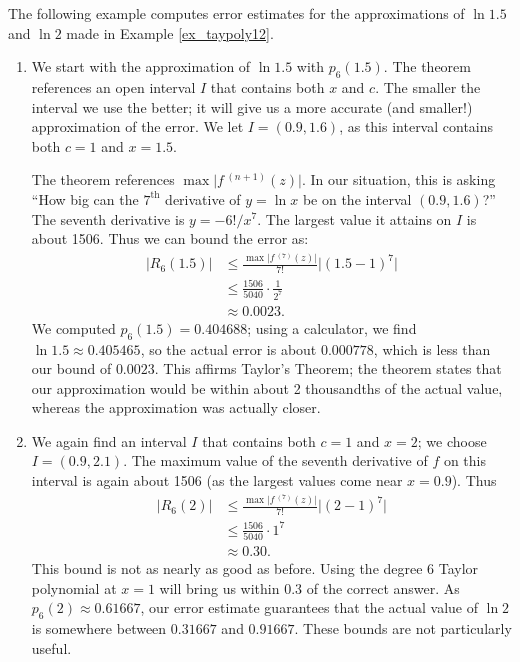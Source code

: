 The following example computes error estimates for the approximations of $\ln 1.5$ and $\ln 2$ made in Example \ref{ex_taypoly12}.\\

{\begin{enumerate}
\item	We start with the approximation of $\ln 1.5$ with $p_6(1.5)$. The theorem references an open interval $I$ that contains both $x$ and $c$. The smaller the interval we use the better; it will give us a more accurate (and smaller!) approximation of the error. We let $I = (0.9,1.6)$, as this interval contains both $c=1$ and $x=1.5$. 

The theorem references $\max\big|f\,^{(n+1)}(z)\big|$. In our situation, this is asking ``How big can the $7^\text{th}$ derivative of $y=\ln x$ be on the interval $(0.9,1.6)$?'' The seventh derivative is $y = -6!/x^7$. The largest value it attains on $I$ is about 1506. Thus we can bound the error as:
\begin{align*}
\big|R_6(1.5)\big| &\leq \frac{\max\big|f\,^{(7)}(z)\big|}{7!}\big|(1.5-1)^7\big|\\
					&\leq \frac{1506}{5040}\cdot\frac1{2^7}\\
					&\approx 0.0023.
\end{align*}
\noindent%
We computed $p_6(1.5) = 0.404688$; using a calculator, we find $\ln 1.5 \approx 0.405465$, so the actual error is about $0.000778$, which is less than our bound of $0.0023$. This affirms Taylor's Theorem; the theorem states that our approximation would be within about 2 thousandths of the actual value, whereas the approximation was actually closer.

\item		We again find an interval $I$ that contains both $c=1$ and $x=2$; we choose $I = (0.9,2.1)$. The maximum value of the seventh derivative of $f$ on this interval is again about 1506 (as the largest values come near $x=0.9$). Thus 
\begin{align*}
\big| R_6(2)\big| &\leq \frac{\max\big|f\,^{(7)}(z)\big|}{7!}\big|(2-1)^7\big|\\
					&\leq \frac{1506}{5040}\cdot1^7\\
					&\approx 0.30.
\end{align*}
This bound is not as nearly as good as before. Using the degree 6 Taylor polynomial at $x =1$ will bring us within 0.3 of the correct answer. As $p_6(2)\approx 0.61667$, our error estimate guarantees that the actual value of $\ln 2$ is somewhere between $0.31667$ and $0.91667$. These bounds are not particularly useful.


\end{enumerate}}
